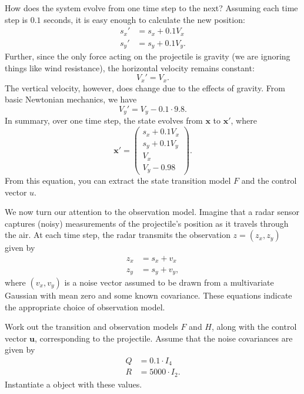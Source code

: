 How does the system evolve from one time step to the next? 
Assuming each time step is $0.1$ seconds, it is easy enough to calculate the new position:
\begin{align*}
s_x' &= s_x + 0.1V_x\\
s_y' &= s_y + 0.1V_y.
\end{align*}
Further, since the only force acting on the projectile is gravity (we are ignoring things like wind resistance), the horizontal velocity remains constant:
\[
V_x' = V_x.
\]
The vertical velocity, however, does change due to the effects of gravity. 
From basic Newtonian mechanics, we have
\[
V_y' = V_y - 0.1\cdot9.8.
\]
In summary, over one time step, the state evolves from $\mathbf{x}$ to $\mathbf{x}'$, where
\[
\mathbf{x}' = \left( \begin{array}{c} s_{x} + 0.1V_x \\ s_{y} + 0.1V_y \\ V_{x} \\ V_{y} - 0.98 \end{array} \right).
\]
From this equation, you can extract the state transition model $F$ and the control vector $u$.

We now turn our attention to the observation model. 
Imagine that a radar sensor captures (noisy) measurements of the projectile's position as it travels through the air.
At each time step, the radar transmits the observation $z = (z_x, z_y)$ given by
\begin{align*}
z_x &= s_x + v_x\\
z_y &= s_y + v_y,
\end{align*}
where $(v_x, v_y)$ is a noise vector assumed to be drawn from a multivariate Gaussian with mean zero and some known covariance.
These equations indicate the appropriate choice of observation model.

\begin{problem}
Work out the transition and observation models $F$ and $H$, along with the control vector $\mathbf{u}$, corresponding to the projectile.
Assume that the noise covariances are given by
\begin{align*}
Q &= 0.1 \cdot I_4\\
R &= 5000 \cdot I_2.
\end{align*}
Instantiate a  object with these values.
\end{problem}

